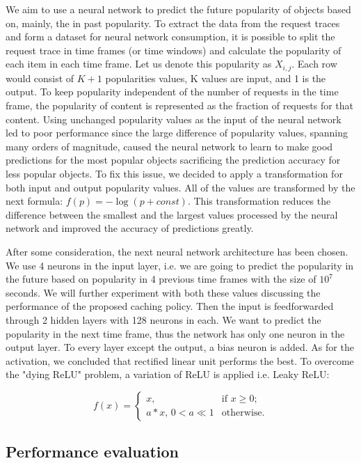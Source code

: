 We aim to use a neural network to predict the future popularity of objects based on, mainly, the in past popularity. To extract the data from the request traces and form a dataset for neural network consumption, it is possible to split the request trace in time frames (or time windows) and calculate the popularity of each item in each time frame. Let us denote this popularity as $ X_{i,j} $. Each row would consist of $ K + 1 $ popularities values, K values are input, and 1 is the output. To keep popularity independent of the number of requests in the time frame, the popularity of content is represented as the fraction of requests for that content. Using unchanged popularity values as the input of the neural network led to poor performance since the large difference of popularity values, spanning many orders of magnitude, caused the neural network to learn to make good predictions for the most popular objects sacrificing the prediction accuracy for less popular objects. To fix this issue, we decided to apply a transformation for both input and output popularity values. All of the values are transformed by the next formula: $ f(p) = -\log(p + const) $. This transformation reduces the difference between the smallest and the largest values processed by the neural network and improved the accuracy of predictions greatly.

After some consideration, the next neural network architecture has been chosen. We use 4 neurons in the input layer, i.e. we are going to predict the popularity in the future based on popularity in 4 previous time frames with the size of $10^7$ seconds. We will further experiment with both these values discussing the performance of the proposed caching policy. Then the input is feedforwarded through 2 hidden layers with 128 neurons in each. We want to predict the popularity in the next time frame, thus the network has only one neuron in the output layer. To every layer except the output, a bias neuron is added. As for the activation, we concluded that rectified linear unit performs the best. To overcome the "dying ReLU"\cite{14} problem, a variation of ReLU is applied i.e. Leaky ReLU:

$$ f(x) = 
	\begin{cases}
	x, & \text{if } x \geq 0; \\
	a*x,\, 0 < a \ll 1 & \text{otherwise.}
	\end{cases}
$$

\subsection{Performance evaluation} \label{performance_eval}

